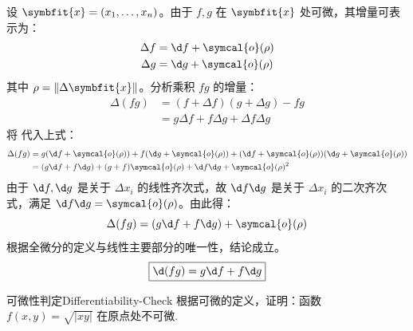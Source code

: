 \begin{myproof}
    设 $\symbfit{x} = (x_1, \dots, x_n)$。由于 $f, g$ 在 $\symbfit{x}$ 处可微，其增量可表示为：
    \begin{equation}
        \label{eq:inc-fg}
        \begin{aligned}
            \Delta f & = \d f + \symcal{o}(\rho) \\
            \Delta g & = \d g + \symcal{o}(\rho)
        \end{aligned}
    \end{equation}
    其中 $\rho = \|\Delta \symbfit{x}\|$。分析乘积 $fg$ 的增量：
    \begin{equation}
        \begin{aligned}
            \Delta(fg) & = (f + \Delta f)(g + \Delta g) - fg           \\
                       & = g \Delta f + f \Delta g + \Delta f \Delta g
        \end{aligned}
    \end{equation}
    将  代入上式：
    \begin{equation}
        \begin{aligned}
            \Delta(fg) & = g (\d f + \symcal{o}(\rho)) + f (\d g + \symcal{o}(\rho)) + (\d f + \symcal{o}(\rho))(\d g + \symcal{o}(\rho)) \\
                       & = (g \d f + f \d g) + (g + f) \symcal{o}(\rho) + \d f \d g + \symcal{o}(\rho)^2
        \end{aligned}
    \end{equation}
    由于 $\d f, \d g$ 是关于 $\Delta x_i$ 的线性齐次式，故 $\d f \d g$ 是关于 $\Delta x_i$ 的二次齐次式，满足 $\d f \d g = \symcal{o}(\rho)$。由此得：
    \begin{equation}
        \Delta(fg) = (g \d f + f \d g) + \symcal{o}(\rho)
    \end{equation}
    根据全微分的定义与线性主要部分的唯一性，结论成立。
    \begin{equation}
        \boxed{\d(fg) = g \d f + f \d g}
    \end{equation}
\end{myproof}

\begin{problem}{可微性判定}{Differentiability-Check}
    根据可微的定义，证明：函数 $f(x, y) = \sqrt{|xy|}$ 在原点处不可微.
\end{problem}

